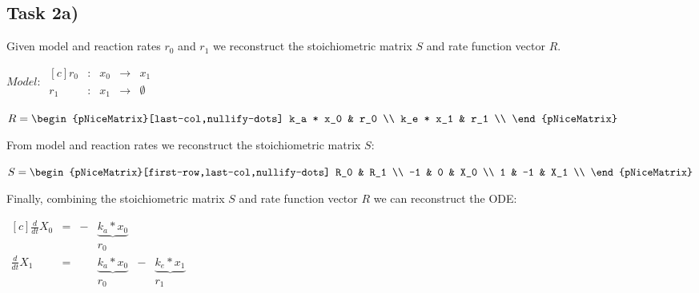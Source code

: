 \documentclass[]{scrartcl}
\begin{document}

\subsection*{Task 2a)}

Given model and reaction rates $r_0$ and $r_1$ we reconstruct the stoichiometric matrix $S$ and rate function vector $R$.

\begin{center}
\noindent \begin{minipage}{.4\linewidth}
$ Model:~ 
\begin{matrix*}[c]
	r_0 & : & x_0 & \rightarrow & x_1 \\
	r_1 & : & x_1 & \rightarrow & \emptyset
\end{matrix*}
$
\end{minipage}
\noindent \begin{minipage}{.4\linewidth}
$
R =
\begin{pNiceMatrix}[last-col,nullify-dots]
	k_a * x_0 & r_0 \\
	k_e	* x_1 & r_1 \\
\end{pNiceMatrix}
$
\end{minipage}
\end{center}

\noindent
From model and reaction rates we reconstruct the stoichiometric matrix $S$:

\noindent \begin{center}
\begin{minipage}{.4\linewidth}
$
S =
\begin{pNiceMatrix}[first-row,last-col,nullify-dots]
	R_0	&	R_1 \\
	 -1 &	  0 &	X_0 \\
	  1 &	 -1 &	X_1 \\
\end{pNiceMatrix}
$
\end{minipage}
\end{center}

\noindent 
Finally, combining the stoichiometric matrix $S$ and rate function vector $R$ we can reconstruct the ODE:

\noindent \begin{center}
\begin{minipage}{.5\linewidth}
$
\begin{matrix*}[c]
	\frac{d}{dt} X_0 & = & - & \underbrace{k_a * x_0}	&	& 							\\ 
					 &   &   & 						r_0 &   &							\\
	\frac{d}{dt} X_1 & = &   & \underbrace{k_a * x_0}	& - & \underbrace{k_e * x_1}	\\
					 &   &   & 						r_0 &   &					r_1 
\end{matrix*}
$
\end{minipage}
\end{center}
\end{document}
